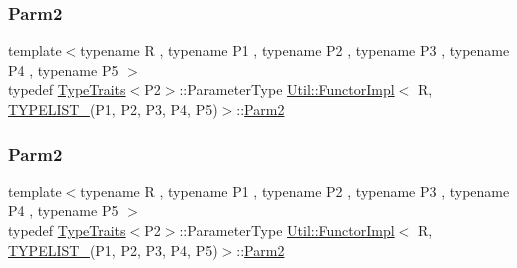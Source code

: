 \mbox{\label{classUtil_1_1FunctorImpl_3_01R_00_01TYPELIST__5_07P1_00_01P2_00_01P3_00_01P4_00_01P5_08_4_a9fbaabce4a80f1e7e9eb68fd8ad2a476}} 
\subsubsection{\texorpdfstring{Parm2}{Parm2}\hspace{0.1cm}{\footnotesize\ttfamily [2/3]}}
{\footnotesize\ttfamily template$<$typename R , typename P1 , typename P2 , typename P3 , typename P4 , typename P5 $>$ \\
typedef \mbox{\hyperlink{classUtil_1_1TypeTraits}{Type\+Traits}}$<$P2$>$\+::Parameter\+Type \mbox{\hyperlink{classUtil_1_1FunctorImpl}{Util\+::\+Functor\+Impl}}$<$ R, \mbox{\hyperlink{adat__devel__install_2include_2adat_2typelist_8h_aad5d9b3c82c8503c85c625acd41c0a2f}{T\+Y\+P\+E\+L\+I\+S\+T\+\_}}(P1, P2, P3, P4, P5)$>$\+::\mbox{\hyperlink{structUtil_1_1Private_1_1FunctorImplBase_a554085cd798ef14838a59b528f0feb2e}{Parm2}}}

\mbox{\label{classUtil_1_1FunctorImpl_3_01R_00_01TYPELIST__5_07P1_00_01P2_00_01P3_00_01P4_00_01P5_08_4_a9fbaabce4a80f1e7e9eb68fd8ad2a476}} 
\subsubsection{\texorpdfstring{Parm2}{Parm2}\hspace{0.1cm}{\footnotesize\ttfamily [3/3]}}
{\footnotesize\ttfamily template$<$typename R , typename P1 , typename P2 , typename P3 , typename P4 , typename P5 $>$ \\
typedef \mbox{\hyperlink{classUtil_1_1TypeTraits}{Type\+Traits}}$<$P2$>$\+::Parameter\+Type \mbox{\hyperlink{classUtil_1_1FunctorImpl}{Util\+::\+Functor\+Impl}}$<$ R, \mbox{\hyperlink{adat__devel__install_2include_2adat_2typelist_8h_aad5d9b3c82c8503c85c625acd41c0a2f}{T\+Y\+P\+E\+L\+I\+S\+T\+\_}}(P1, P2, P3, P4, P5)$>$\+::\mbox{\hyperlink{structUtil_1_1Private_1_1FunctorImplBase_a554085cd798ef14838a59b528f0feb2e}{Parm2}}}

